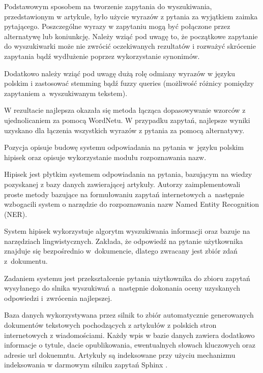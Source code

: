 Podstawowym sposobem na tworzenie zapytania do wyszukiwania, przedstawionym w artykule, było użycie wyrazów z pytania za wyjątkiem zaimka pytającego. Poszczególne wyrazy w zapytaniu mogą być połączone przez alternatywę lub koniunkcję. Należy wziąć pod uwagę to, że początkowe zapytanie do wyszukiwarki może nie zwrócić oczekiwanych rezultatów i rozważyć skrócenie zapytania bądź wydłużenie poprzez wykorzystanie synonimów. 

Dodatkowo należy wziąć pod uwagę dużą rolę odmiany wyrazów w języku polskim i zastosować stemming bądź fuzzy queries (możliwość różnicy pomiędzy zapytaniem a~wyszukiwanym tekstem).

W rezultacie najlepsza okazała się metoda łącząca dopasowywanie wzorców z ujednolicaniem za pomocą WordNetu. W przypadku zapytań, najlepsze wyniki uzyskano dla łączenia wszystkich wyrazów z pytania za pomocą alternatywy\cite{przybyla-2013-question}. 

Pozycja \cite{polishQAS} opisuje budowę systemu odpowiadania na pytania w~języku polskim hipisek oraz opisuje wykorzystanie modułu rozpoznawania nazw.

Hipisek jest płytkim systemem odpowiadania na pytania, bazującym na wiedzy pozyskanej z bazy danych zawierającej artykuły. Autorzy zaimplementowali proste metody bazujące na formułowaniu zapytań internetowych a~następnie wzbogacili system o narzędzie do rozpoznawania nazw Named Entity Recognition (NER). 

System hipisek wykorzystuje algorytm wyszukiwania informacji oraz bazuje na narzędziach lingwistycznych. Zakłada, że odpowiedź na pytanie użytkownika znajduje się bezpośrednio w~dokumencie, dlatego zwracany jest zbiór zdań z~dokumentu.

Zadaniem systemu jest przekształcenie pytania użytkownika do zbioru zapytań wysyłanego do slnika wyszukiwań a~następnie dokonania oceny uzyskanych odpowiedzi i~zwrócenia najlepszej.

Baza danych wykorzystywana przez silnik to zbiór automatycznie generowanych dokumentów tekstowych pochodzących z artykułów z polskich stron internetowych z wiadomościami. Każdy wpis w bazie danych zawiera dodatkowo informacje o tytule, dacie opublikowania, ewentualnych słowach kluczowych oraz adresie url dokuemntu. Artykuły są indeksowane przy użyciu mechanizmu indeksowania w darmowym silniku zapytań Sphinx \cite{sphinx}. 

